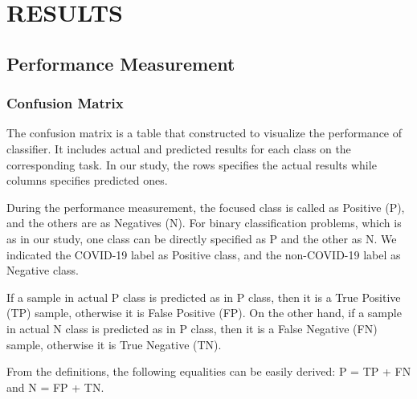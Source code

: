 \chapter{RESULTS}\label{ch:CH6}

\section{Performance Measurement}

\subsection{Confusion Matrix}

The confusion matrix is a table that constructed to visualize the performance of classifier. It includes actual and predicted results for each class on the corresponding task. In our study, the rows specifies the actual results while columns specifies predicted ones.

During the performance measurement, the focused class is called as Positive (P), and the others are as Negatives (N). For binary classification problems, which is as in our study, one class can be directly specified as P and the other as N. We indicated the COVID-19 label as Positive class, and the non-COVID-19 label as Negative class.

If a sample in actual P class is predicted as in P class, then it is a True Positive (TP) sample, otherwise it is False Positive (FP). On the other hand, if a sample in actual N class is predicted as in P class, then it is a False Negative (FN) sample, otherwise it is True Negative (TN).

From the definitions, the following equalities can be easily derived: P = TP + FN and N = FP + TN.

